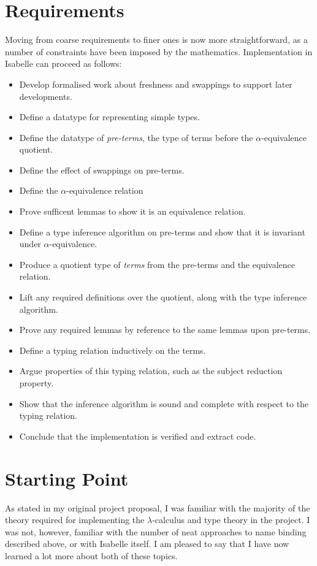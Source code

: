 \section{Requirements}
Moving from coarse requirements to finer ones is now more straightforward, as a number of constraints have been imposed by the mathematics.
Implementation in Isabelle can proceed as follows:
\begin{itemize}
\item
Develop formalised work about freshness and swappings to support later developments.
\item
Define a datatype for representing simple types.
\item
Define the datatype of \emph{pre-terms}, the type of terms before the \(\alpha\)-equivalence quotient.
\item
Define the effect of swappings on pre-terms.
\item
Define the \(\alpha\)-equivalence relation
\item
Prove sufficent lemmas to show it is an equivalence relation.
\item
Define a type inference algorithm on pre-terms and show that it is invariant under \(\alpha\)-equivalence.
\item
Produce a quotient type of \emph{terms} from the pre-terms and the equivalence relation.
\item
Lift any required definitions over the quotient, along with the type inference algorithm.
\item
Prove any required lemmas by reference to the same lemmas upon pre-terms.
\item
Define a typing relation inductively on the terms.
\item
Argue properties of this typing relation, such as the subject reduction property.
\item
Show that the inference algorithm is sound and complete with respect to the typing relation.
\item
Conclude that the implementation is verified and extract code.
\end{itemize}

\section{Starting Point}
As stated in my original project proposal, I was familiar with the majority of the theory required for implementing the \(\lambda\)-calculus and type theory in the project.
I was not, however, familiar with the number of neat approaches to name binding described above, or with Isabelle itself.
I am pleased to say that I have now learned a lot more about both of these topics.
